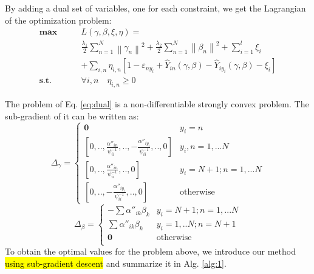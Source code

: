 By adding a dual set of variables, one for each constraint, we get the Lagrangian of the optimization problem:
\begin{equation}\label{eq:dual}
\begin{aligned}
 \textbf{max}\qquad {}& L\left( {\gamma ,\beta ,\xi ,\eta } \right) =\\
 &\frac{{{\lambda _1}}}{2}\sum\limits_{n = 1}^N {{{\left\| {{\gamma _n}} \right\|}^2}}  + \frac{{{\lambda _2}}}{2}\sum\limits_{n = 1}^N {{{\left\| {{\beta _n}} \right\|}^2}}  + \sum\limits_{i = 1}^l {{\xi _i}} \\
   &+ \sum\limits_{i,n} {{\eta _{i,n}}\left[ {1 - {\varepsilon _{n{y_i}}} + {{\hat Y}_{in}}\left( {\gamma ,\beta } \right) - {{\hat Y}_{i{y_i}}}\left( {\gamma ,\beta } \right) - {\xi _i}} \right]}  \\
 \textbf{s.t.} \qquad {} & \forall i,n \quad {} {\eta _{i,n}} \ge 0
\end{aligned}
\end{equation}

The problem of Eq. \eqref{eq:dual} is a non-differentiable strongly convex problem. The sub-gradient of it can be written as:
\begin{equation*}
{\Delta _\gamma }=\begin{cases}
\boldsymbol{0}&{y_i}=n\\
\left[ {0,..,\frac{{\alpha ''}_{in}}{\psi _{ii}^{ - 1}},.., - \frac{{\alpha ''}_{i{y_i}}}{\psi _{ii}^{ - 1}},..,0} \right]&{y_i},n = 1,...N\\
\left[ {0,..,\frac{{\alpha ''}_{in}}{\psi _{ii}^{ - 1}},..,0} \right]&{y_i} = N + 1;n = 1,...N\\
\left[ {0,.., - \frac{{\alpha ''}_{i{y_i}}}{\psi _{ii}^{ - 1}},..,0} \right]&\text{otherwise}
\end{cases}
\end{equation*}
\begin{equation*}
{\Delta _\beta }=\begin{cases}
 - \sum {{{\alpha ''}_{ik}}{\beta _k}} &{y_i} = N + 1;n = 1,...N\\
 \sum {{{\alpha ''}_{ik}}{\beta _k}} &{y_i} = 1,..N;n = N+1\\
\boldsymbol{0}&\text{otherwise}\\
\end{cases}
\end{equation*}
To obtain the optimal values for the problem above, we introduce our method \hl{using sub-gradient descent }\cite{BoydCO} and summarize it in Alg. \ref{alg:1}. 


